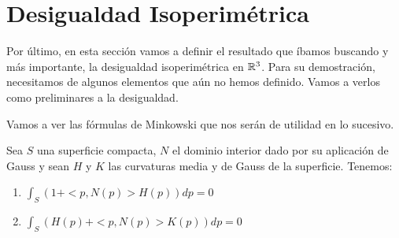 \section{Desigualdad Isoperimétrica}
Por último, en esta sección vamos a definir el resultado que íbamos buscando y  más importante, la desigualdad isoperimétrica en $\mathbb{R}^3$. Para su demostración, necesitamos de algunos elementos que aún no hemos definido. Vamos a verlos como preliminares a la desigualdad.

Vamos a ver las fórmulas de Minkowski que nos serán de utilidad en lo sucesivo.
\begin{theorem}
Sea $S$ una superficie compacta, $N$ el dominio interior dado por su aplicación de Gauss y sean $H$ y $K$ las curvaturas media y de Gauss de la superficie. Tenemos:

\begin{enumerate}
    \item $\int_S (1+<p, N(p)>H(p))dp = 0$
    \item $\int_S (H(p)+<p, N(p)>K(p))dp = 0$
\end{enumerate}
\end{theorem}
